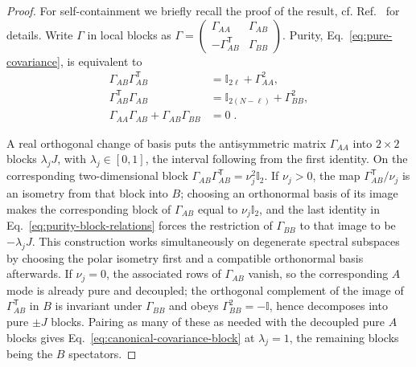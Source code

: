 \documentclass[prx,twocolumn,superscriptaddress,aps,10pt, frontmatterverbose, reprint,footinbib,longbibliography=true]{revtex4-2}
\newcommand{\trans}{\mathsf{T}}
\begin{document}
\begin{proof}
For self-containment we briefly recall the proof of the result, cf. Ref.~\cite{BoteroReznik2004} for details.
Write $\Gamma$ in local blocks as $\Gamma=\left(\begin{smallmatrix} \Gamma_{AA}&\Gamma_{AB}\\ -\Gamma_{AB}^{\trans}&\Gamma_{BB}\end{smallmatrix}\right)$. Purity, Eq.~\eqref{eq:pure-covariance}, is equivalent to
\begin{equation}\begin{split}\Gamma_{AB}\Gamma_{AB}^{\trans}&=\mathbb{I}_{2\ell}+\Gamma_{AA}^2,\\ \Gamma_{AB}^{\trans}\Gamma_{AB}&=\mathbb{I}_{2(N-\ell)}+\Gamma_{BB}^2,\\ \Gamma_{AA}\Gamma_{AB}+\Gamma_{AB}\Gamma_{BB}&=0\;.
    \label{eq:purity-block-relations}
\end{split}\end{equation}

A real orthogonal change of basis puts the antisymmetric matrix $\Gamma_{AA}$  into $2\times 2$ blocks $\lambda_jJ$, with $\lambda_j\in[0,1]$, the interval following from the first identity. On the corresponding two-dimensional block $\Gamma_{AB}\Gamma_{AB}^{\trans}=\nu_j^2\mathbb{I}_2$. If $\nu_j>0$, the map $\Gamma_{AB}^{\trans}/\nu_j$ is an isometry from that block into $B$; choosing an orthonormal basis of its image makes the corresponding block of $\Gamma_{AB}$ equal to $\nu_j\mathbb{I}_2$, and the last identity in Eq.~\eqref{eq:purity-block-relations} forces the restriction of $\Gamma_{BB}$ to that image to be $-\lambda_jJ$. This construction works simultaneously on degenerate spectral subspaces by choosing the polar isometry first and a compatible orthonormal basis afterwards. If $\nu_j=0$, the associated rows of $\Gamma_{AB}$ vanish, so the corresponding $A$ mode is already pure and decoupled; the orthogonal complement of the image of $\Gamma_{AB}^{\trans}$  in $B$ is invariant under $\Gamma_{BB}$ and obeys $\Gamma_{BB}^2=-\mathbb{I}$, hence decomposes into pure $\pm J$ blocks. Pairing as many of these as needed with the decoupled pure $A$ blocks gives Eq.~\eqref{eq:canonical-covariance-block} at $\lambda_j=1$, the remaining blocks being the $B$ spectators.
\end{proof}
\end{document}
